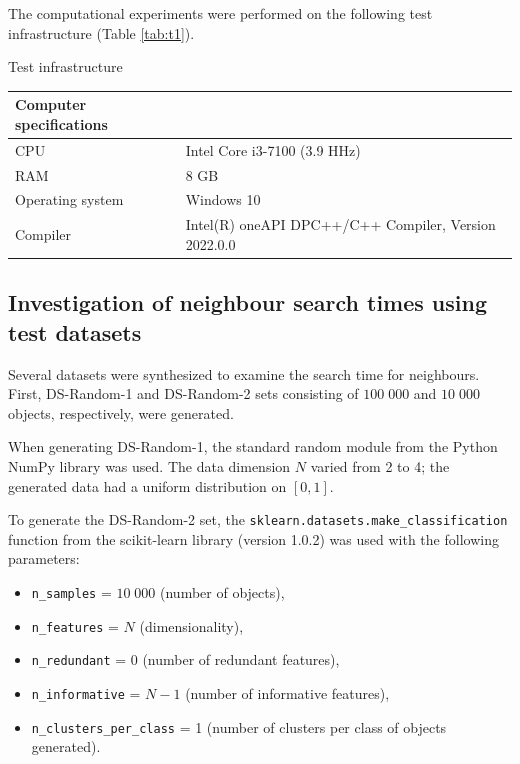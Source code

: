 \documentclass[entropy,article,submit,moreauthors,pdftex]{Definitions/mdpi}
\begin{document}
\begin{paracol}{2}

The computational experiments were performed on the following test infrastructure (Table \ref{tab:t1}).

\begin{specialtable}[H] 
    \caption{Test infrastructure}\label{tab:t1}
	\center
\begin{tabular}{ll}
\toprule
	  Computer specifications & \\
\midrule													
		CPU & Intel Core i3-7100 (3.9 HHz) \\
		RAM & 8 GB \\ 
		Operating system & Windows 10 \\
		Compiler & Intel(R) oneAPI DPC++/C++ Compiler, Version 2022.0.0 \\
\bottomrule
\end{tabular}
\end{specialtable}

\subsection{Investigation of neighbour search times using test datasets}

Several datasets were synthesized to examine the search time for neighbours. First, DS-Random-1 and DS-Random-2 sets consisting of $100\;000$ and $10\;000$ objects, respectively, were generated.

When generating DS-Random-1, the standard random module from the Python NumPy library was used. The data dimension $N$ varied from 2 to 4; the generated data had a uniform distribution on $[0, 1]$.

To generate the DS-Random-2 set, the \texttt{sklearn.datasets.make\_classification} function from the scikit-learn library (version 1.0.2) was used with the following parameters: 

\begin{itemize}
\item \texttt{n\_samples} = $10\;000$ (number of objects),
\item \texttt{n\_features} =  $N$ (dimensionality),
\item \texttt{n\_redundant} = 0 (number of redundant features),
\item \texttt{n\_informative} = $N - 1$  (number of informative features),
\item \texttt{n\_clusters\_per\_class} = 1 (number of clusters per class of objects generated).
\end{itemize}
  

\end{paracol}
\end{document}
